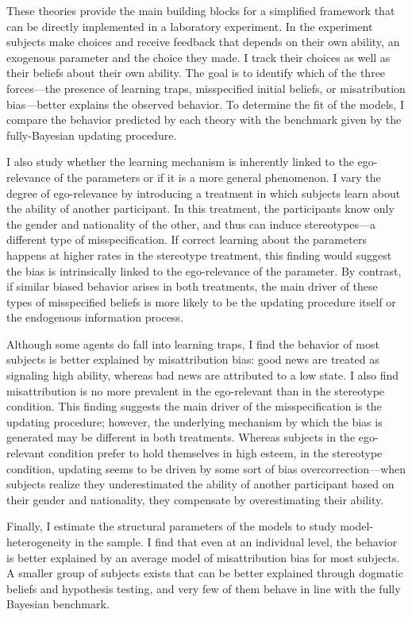 \documentclass[
  12pt,
]{article}
\begin{document}
These theories provide the main building blocks for a simplified
framework that can be directly implemented in a laboratory experiment.
In the experiment subjects make choices and receive feedback that
depends on their own ability, an exogenous parameter and the choice they
made. I track their choices as well as their beliefs about their own
ability. The goal is to identify which of the three forces---the
presence of learning traps, misspecified initial beliefs, or
misatribution bias---better explains the observed behavior. To determine
the fit of the models, I compare the behavior predicted by each theory
with the benchmark given by the fully-Bayesian updating procedure.

I also study whether the learning mechanism is inherently linked to the
ego-relevance of the parameters or if it is a more general phenomenon. I
vary the degree of ego-relevance by introducing a treatment in which
subjects learn about the ability of another participant. In this
treatment, the participants know only the gender and nationality of the
other, and thus can induce stereotypes---a different type of
misspecification. If correct learning about the parameters happens at
higher rates in the stereotype treatment, this finding would suggest the
bias is intrinsically linked to the ego-relevance of the parameter. By
contrast, if similar biased behavior arises in both treatments, the main
driver of these types of misspecified beliefs is more likely to be the
updating procedure itself or the endogenous information process.

Although some agents do fall into learning traps, I find the behavior of
most subjects is better explained by misattribution bias: good news are
treated as signaling high ability, whereas bad news are attributed to a
low state. I also find misattribution is no more prevalent in the
ego-relevant than in the stereotype condition. This finding suggests the
main driver of the misspecification is the updating procedure; however,
the underlying mechanism by which the bias is generated may be different
in both treatments. Whereas subjects in the ego-relevant condition
prefer to hold themselves in high esteem, in the stereotype condition,
updating seems to be driven by some sort of bias overcorrection---when
subjects realize they underestimated the ability of another participant
based on their gender and nationality, they compensate by overestimating
their ability.

Finally, I estimate the structural parameters of the models to study
model-heterogeneity in the sample. I find that even at an individual
level, the behavior is better explained by an average model of
misattribution bias for most subjects. A smaller group of subjects
exists that can be better explained through dogmatic beliefs and
hypothesis testing, and very few of them behave in line with the fully
Bayesian benchmark.
\end{document}
